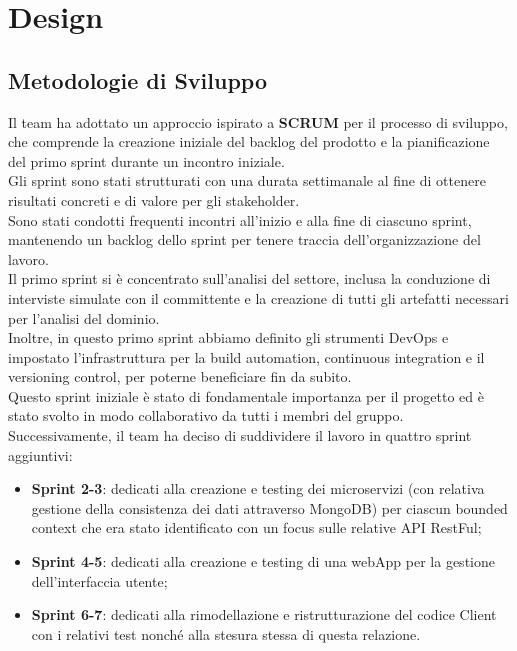 \section{Design}
\subsection{Metodologie di Sviluppo}

Il team ha adottato un approccio ispirato a \textbf{SCRUM} per il processo di sviluppo,
che comprende la creazione iniziale del backlog del prodotto e la pianificazione
del primo sprint durante un incontro iniziale.\\
Gli sprint sono stati strutturati con una durata settimanale al fine di ottenere
risultati concreti e di valore per gli stakeholder.\\ Sono stati condotti frequenti
incontri all'inizio e alla fine di ciascuno sprint, mantenendo un backlog dello sprint
per tenere traccia dell'organizzazione del lavoro.\\
Il primo sprint si è concentrato sull'analisi del settore, inclusa la conduzione di
interviste simulate con il committente e la creazione di tutti gli artefatti necessari
per l'analisi del dominio.\\ Inoltre, in questo primo sprint abbiamo definito gli strumenti
DevOps e impostato l'infrastruttura per la build automation, continuous integration
e il versioning control, per poterne beneficiare fin da subito.\\ Questo sprint iniziale
è stato di fondamentale importanza per il progetto ed è stato svolto in modo collaborativo
da tutti i membri del gruppo.\\
Successivamente, il team ha deciso di suddividere il lavoro in quattro sprint aggiuntivi:

\begin{itemize}
    \item \textbf{Sprint 2-3}: dedicati alla creazione e testing dei microservizi (con relativa gestione della consistenza dei dati attraverso MongoDB) per ciascun bounded context che era stato identificato con un focus sulle relative API RestFul;
    \item \textbf{Sprint 4-5}: dedicati alla creazione e testing di una webApp per la gestione dell’interfaccia utente;
    \item \textbf{Sprint 6-7}: dedicati alla rimodellazione e ristrutturazione del codice Client con i relativi test nonché alla stesura stessa di questa relazione.
\end{itemize}

